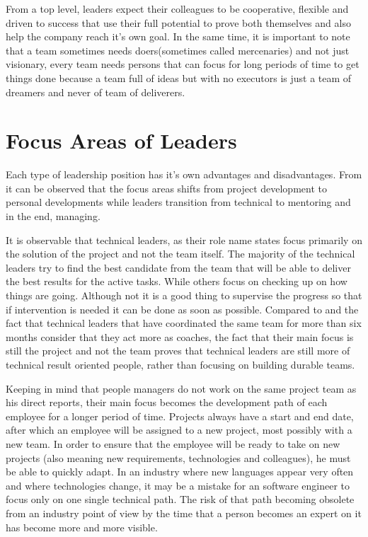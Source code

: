 From a top level, leaders expect their colleagues to be cooperative, flexible and driven to success that use their full potential to prove both themselves and also help the company reach it's own goal. In the same time, it is important to note that a team sometimes needs doers(sometimes called mercenaries) and not just visionary, every team needs persons that can focus for long periods of time to get things done because a team full of ideas but with no executors is just a team of dreamers and never of team of deliverers.
\section{Focus Areas of Leaders}
\label{sec:focus}
Each type of leadership position has it's own advantages and disadvantages.
From  it can be observed that the focus areas shifts from project development to personal developments while leaders transition from technical to mentoring and in the end, managing.

It is observable that technical leaders, as their role name states focus primarily on the solution of the project and not the team itself. The majority of the technical leaders try to find the best candidate from the team that will be able to deliver the best results for the active tasks. While others focus on checking up on how things are going. Although not it is a good thing to supervise the progress so that if intervention is needed it can be done as soon as possible. Compared to  and the fact that technical leaders that have coordinated the same team for more than six months consider that they act more as coaches, the fact that their main focus is still the project and not the team proves that technical leaders are still more of technical result oriented people, rather than focusing on building durable teams.

Keeping in mind that people managers do not work on the same project team as his direct reports, their main focus becomes the development path of each employee for a longer period of time. Projects always have a start and end date, after which an employee will be assigned to a new project, most possibly with a new team. In order to ensure that the employee will be ready to take on new projects (also meaning new requirements, technologies and colleagues), he must be able to quickly adapt. In an industry where new languages appear very often and where technologies change, it may be a mistake for an software engineer to focus only on one single technical path. The risk of that path becoming obsolete from an industry point of view by the time that a person becomes an expert on it has become more and more visible.

